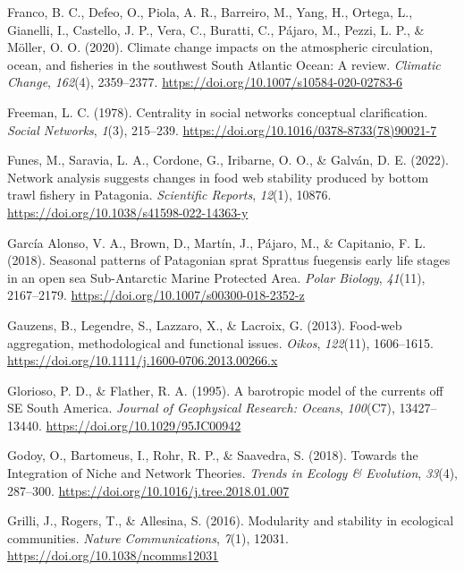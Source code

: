 \documentclass[preprint, 3p,
authoryear]{elsarticle} %
\newlength{\cslhangindent}
\newlength{\cslentryspacingunit} %
\newenvironment{CSLReferences}[2] %
 {%
  \setlength{\parindent}{0pt}
  \ifodd #1
  \let\oldpar\par
  \def\par{\hangindent=\cslhangindent\oldpar}
  \fi
  \setlength{\parskip}{#2\cslentryspacingunit}
 }%
 {}
\begin{document}
\begin{CSLReferences}{1}{0}
\leavevmode{}%
Franco, B. C., Defeo, O., Piola, A. R., Barreiro, M., Yang, H., Ortega,
L., Gianelli, I., Castello, J. P., Vera, C., Buratti, C., Pájaro, M.,
Pezzi, L. P., \& Möller, O. O. (2020). Climate change impacts on the
atmospheric circulation, ocean, and fisheries in the southwest {South
Atlantic Ocean}: A review. \emph{Climatic Change}, \emph{162}(4),
2359--2377. \url{https://doi.org/10.1007/s10584-020-02783-6}

\leavevmode{}%
Freeman, L. C. (1978). Centrality in social networks conceptual
clarification. \emph{Social Networks}, \emph{1}(3), 215--239.
\url{https://doi.org/10.1016/0378-8733(78)90021-7}

\leavevmode{}%
Funes, M., Saravia, L. A., Cordone, G., Iribarne, O. O., \& Galván, D.
E. (2022). Network analysis suggests changes in food web stability
produced by bottom trawl fishery in {Patagonia}. \emph{Scientific
Reports}, \emph{12}(1), 10876.
\url{https://doi.org/10.1038/s41598-022-14363-y}

\leavevmode{}%
García Alonso, V. A., Brown, D., Martín, J., Pájaro, M., \& Capitanio,
F. L. (2018). Seasonal patterns of {Patagonian} sprat {Sprattus}
fuegensis early life stages in an open sea {Sub-Antarctic Marine
Protected Area}. \emph{Polar Biology}, \emph{41}(11), 2167--2179.
\url{https://doi.org/10.1007/s00300-018-2352-z}

\leavevmode{}%
Gauzens, B., Legendre, S., Lazzaro, X., \& Lacroix, G. (2013). Food-web
aggregation, methodological and functional issues. \emph{Oikos},
\emph{122}(11), 1606--1615.
\url{https://doi.org/10.1111/j.1600-0706.2013.00266.x}

\leavevmode{}%
Glorioso, P. D., \& Flather, R. A. (1995). A barotropic model of the
currents off {SE South America}. \emph{Journal of Geophysical Research:
Oceans}, \emph{100}(C7), 13427--13440.
\url{https://doi.org/10.1029/95JC00942}

\leavevmode{}%
Godoy, O., Bartomeus, I., Rohr, R. P., \& Saavedra, S. (2018). Towards
the {Integration} of {Niche} and {Network Theories}. \emph{Trends in
Ecology \& Evolution}, \emph{33}(4), 287--300.
\url{https://doi.org/10.1016/j.tree.2018.01.007}

\leavevmode{}%
Grilli, J., Rogers, T., \& Allesina, S. (2016). Modularity and stability
in ecological communities. \emph{Nature Communications}, \emph{7}(1),
12031. \url{https://doi.org/10.1038/ncomms12031}


\end{CSLReferences}
\end{document}
